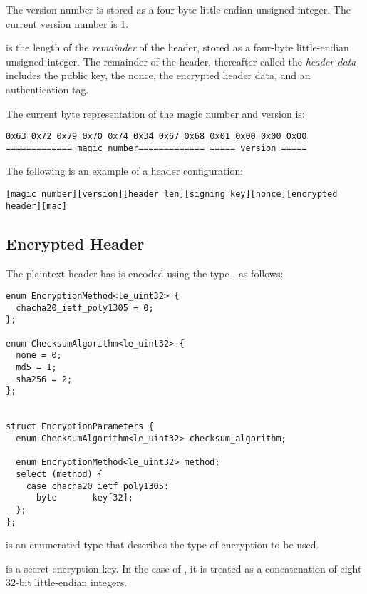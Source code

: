 The version number is stored as a four-byte little-endian unsigned integer.
%
The current version number is 1.

 is the length of the \emph{remainder} of the header, stored as a four-byte little-endian unsigned integer.
%
The remainder of the header, thereafter called the \emph{header data} includes the public key, the nonce, the encrypted header data, and an authentication tag.
%

The current byte representation of the magic number and version is:
\begin{verbatim}
0x63 0x72 0x79 0x70 0x74 0x34 0x67 0x68 0x01 0x00 0x00 0x00
============= magic_number============= ===== version =====
\end{verbatim}

The following is an example of a header configuration:
%
\begin{verbatim}
[magic number][version][header len][signing key][nonce][encrypted header][mac]
\end{verbatim}


\subsection{Encrypted Header}\label{encrypted:header}
%

The plaintext header has is encoded using the type , as follows:

\begin{verbatim}
enum EncryptionMethod<le_uint32> {
  chacha20_ietf_poly1305 = 0;
};

enum ChecksumAlgorithm<le_uint32> {
  none = 0;
  md5 = 1;
  sha256 = 2;
};


struct EncryptionParameters {
  enum ChecksumAlgorithm<le_uint32> checksum_algorithm;

  enum EncryptionMethod<le_uint32> method;
  select (method) {
    case chacha20_ietf_poly1305:
      byte       key[32];
  };
};
\end{verbatim}

 is an enumerated type that describes the type of encryption to be used.

 is a secret encryption key.
%
In the case of , it is treated as a concatenation of eight 32-bit little-endian integers.

